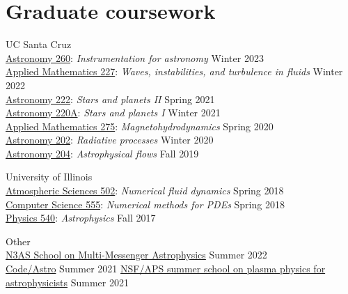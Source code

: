 \documentclass[12pt]{article}
\begin{document}
\else\fi

\ifdefined\withcourses{}
\section*{Graduate coursework}

UC Santa Cruz\\
\href{https://catalog.ucsc.edu/Current/General-Catalog/Courses/ASTR-Astronomy-and-Astrophysics/200/ASTR-260}{Astronomy 260}: \textit{Instrumentation for astronomy} \hfill Winter 2023\\
\href{https://catalog.ucsc.edu/en/Current/General-Catalog/Courses/AM-Applied-Mathematics/Graduate/AM-227}{Applied Mathematics 227}: \textit{Waves, instabilities, and turbulence in fluids} \hfill Winter 2022\\
\href{https://catalog.ucsc.edu/Current/General-Catalog/Courses/ASTR-Astronomy-and-Astrophysics/200/ASTR-222}{Astronomy 222}: \textit{Stars and planets II} \hfill Spring 2021\\
\href{https://catalog.ucsc.edu/Current/General-Catalog/Courses/ASTR-Astronomy-and-Astrophysics/200/ASTR-220A}{Astronomy 220A}: \textit{Stars and planets I} \hfill Winter 2021\\
\href{https://catalog.ucsc.edu/en/Current/General-Catalog/Courses/AM-Applied-Mathematics/Graduate/AM-275}{Applied Mathematics 275}: \textit{Magnetohydrodynamics} \hfill Spring 2020\\
\href{https://catalog.ucsc.edu/en/Current/General-Catalog/Courses/ASTR-Astronomy-and-Astrophysics/200/ASTR-202}{Astronomy 202}: \textit{Radiative processes} \hfill Winter 2020\\
\href{https://catalog.ucsc.edu/en/Current/General-Catalog/Courses/ASTR-Astronomy-and-Astrophysics/200/ASTR-204}{Astronomy 204}: \textit{Astrophysical flows} \hfill Fall 2019

University of Illinois\\
\href{https://courses.illinois.edu/schedule/2018/spring/ATMS/502}{Atmospheric Sciences 502}: \textit{Numerical fluid dynamics} \hfill Spring 2018\\
\href{https://cs.illinois.edu/academics/courses/cs555}{Computer Science 555}: \textit{Numerical methods for PDEs} \hfill Spring 2018\\
\href{https://physics.illinois.edu/academics/courses/profile/PHYS\%20540}{Physics 540}: \textit{Astrophysics} \hfill Fall 2017

Other\\
\href{https://n3as.berkeley.edu/events/summer-school/}{N3AS School on Multi-Messenger Astrophysics} \hfill Summer 2022\\
\href{https://semaphorep.github.io/codeastro/}{Code/Astro} \hfill Summer 2021
\href{https://www.gpapschool.com/}{NSF/APS summer school on plasma physics for astrophysicists} \hfill Summer 2021
\else\fi
\end{document}

